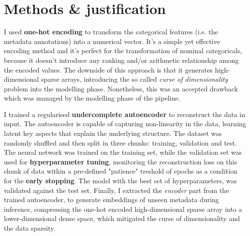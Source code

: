 
\section{Methods \& justification}

I used \textbf{one-hot encoding} to transform the categorical features (i.e. the metadata annotations) into a numerical vector.
It's a simple yet effective encoding method and it's perfect for the transformation of nominal categoricals,
because it doesn't introduce any ranking and/or arithmetic relationship among the
encoded values. The downside of this approach is that it generates high-dimensional sparse arrays, introducing the
so called \textit{curse of dimensionality} problem into the modelling phase. Nonetheless, this was an accepted drawback which was
managed by the modelling phase of the pipeline.

I trained a regularised \textbf{undercomplete autoencoder} to reconstruct the data in input.
The autoencoder is capable of capturing non-linearity in the data, learning latent key aspects that explain the underlying structure.
The dataset was randomly shuffled and then split in three chunks: training, validation and test.
The neural network was trained on the training set,
while the validation set was used for \textbf{hyperparameter tuning}, monitoring the reconstruction loss on this chunk of data
within a pre-defined "patience" treshold of epochs as a condition for the \textbf{early stopping}.
The model with the best set of hyperparameters, was validated against
the test set. Finally, I extracted the \textit{encoder} part from the trained autoencoder, to generate embeddings of unseen metadata
during inference, compressing the one-hot encoded high-dimensional sparse array into a lower-dimensional dense space,
which mitigated the curse of dimensionality and the data sparsity.

